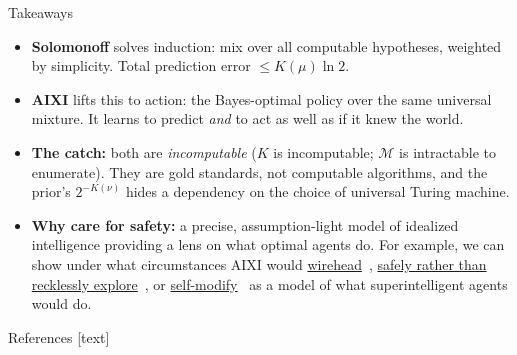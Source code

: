 \documentclass[10pt,aspectratio=169]{beamer}
\newcommand{\cM}{\mathcal{M}}
\begin{document}
\begin{frame}{Takeaways}
\begin{itemize}
    \item \textbf{Solomonoff} solves induction: mix over all computable hypotheses, weighted by simplicity.
    Total prediction error $\leq K(\mu)\ln 2$.
    \pause
    \item \textbf{AIXI} lifts this to action: the Bayes-optimal policy over the same universal mixture.
    It learns to predict \emph{and} to act as well as if it knew the world.
    \pause
    \item \textbf{The catch:} both are \emph{incomputable} ($K$ is incomputable; $\cM$ is intractable to enumerate).
    They are gold standards, not computable algorithms, and the prior's $2^{-K(\nu)}$ hides a dependency
    on the choice of universal Turing machine.
    \pause
    \item \textbf{Why care for safety:} a precise, assumption-light model of idealized 
    intelligence providing a lens on what optimal agents do. For example, we
    can show under what circumstances AIXI would \href{https://people.idsia.ch/~ring/AGI-2011/Paper-B.pdf}{wirehead}~,
    \href{https://arxiv.org/pdf/2006.03357}{safely rather than recklessly explore}~, or
    \href{https://link.springer.com/chapter/10.1007/978-3-642-22887-2_1}{self-modify}~
    as a model of what superintelligent agents would do.
\end{itemize}
\end{frame}

\begin{frame}[allowframebreaks]{References}
\footnotesize
{}[text]


\end{frame}
\end{document}
